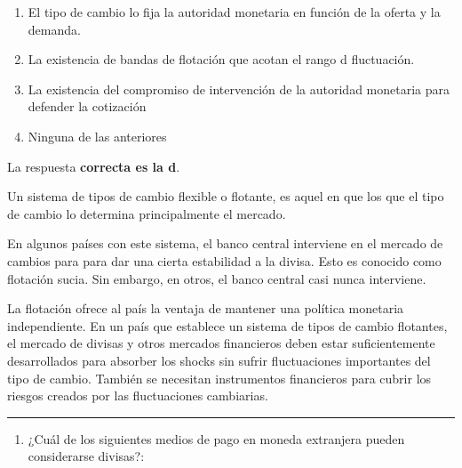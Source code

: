 \documentclass[
  letterpaper,
  DIV=11,
  numbers=noendperiod]{scrreprt}
\providecommand{\tightlist}{%
  \setlength{\itemsep}{0pt}\setlength{\parskip}{0pt}}\usepackage{longtable,booktabs,array}
\begin{document}
\begin{enumerate}
\def\labelenumi{\alph{enumi})}
\item
  El tipo de cambio lo fija la autoridad monetaria en función de la
  oferta y la demanda.
\item
  La existencia de bandas de flotación que acotan el rango d
  fluctuación.
\item
  La existencia del compromiso de intervención de la autoridad monetaria
  para defender la cotización
\item
  Ninguna de las anteriores
\end{enumerate}

\begin{tcolorbox}[enhanced jigsaw, left=2mm, opacityback=0, colback=white, breakable, arc=.35mm, bottomrule=.15mm, rightrule=.15mm, toprule=.15mm, leftrule=.75mm, colframe=quarto-callout-tip-color-frame]
\begin{minipage}[t]{5.5mm}
\textcolor{quarto-callout-tip-color}{\faLightbulb}
\end{minipage}%
\begin{minipage}[t]{\textwidth - 5.5mm}

La respuesta \textbf{correcta es la d}.

Un sistema de tipos de cambio flexible o flotante, es aquel en que los
que el tipo de cambio lo determina principalmente el mercado.

En algunos países con este sistema, el banco central interviene en el
mercado de cambios para para dar una cierta estabilidad a la divisa.
Esto es conocido como flotación sucia. Sin embargo, en otros, el banco
central casi nunca interviene.

La flotación ofrece al país la ventaja de mantener una política
monetaria independiente. En un país que establece un sistema de tipos de
cambio flotantes, el mercado de divisas y otros mercados financieros
deben estar suficientemente desarrollados para absorber los shocks sin
sufrir fluctuaciones importantes del tipo de cambio. También se
necesitan instrumentos financieros para cubrir los riesgos creados por
las fluctuaciones cambiarias.

\end{minipage}%
\end{tcolorbox}

\begin{center}\rule{0.5\linewidth}{0.5pt}\end{center}

\begin{enumerate}
\def\labelenumi{\arabic{enumi}.}
\setcounter{enumi}{2}
\tightlist
\item
  ¿Cuál de los siguientes medios de pago en moneda extranjera pueden
  considerarse divisas?:
\end{enumerate}
\end{document}
